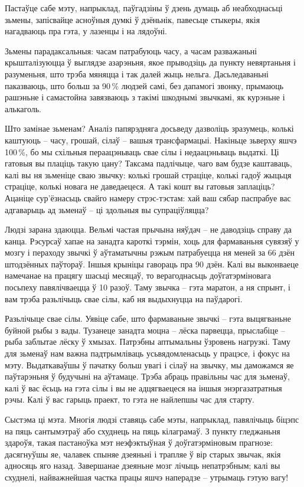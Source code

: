 Пастаўце сабе мэту, напрыклад, паўгадзіны ў дзень думаць аб неабходнасьці зьмены, запісвайце асноўныя думкі ў дзёньнік, павесьце стыкеры, якія нагадваюць пра гэта, у лазенцы і на лядоўні.

Зьмены парадаксальныя: часам патрабуюць часу, а часам разважаньні крышталізуюцца ў выглядзе азарэньня, якое прыводзіць да пункту невяртаньня і разуменьня, што трэба мяняцца і так далей жыць нельга. Дасьледаваньні паказваюць, што больш за 90\,\% людзей самі, без дапамогі звонку, прымаюць рашэньне і самастойна завязваюць з такімі шкоднымі звычкамі, як курэньне і алькаголь. 

Што замінае зьменам? Аналіз папярэдняга досьведу дазволіць зразумець, колькі каштуюць – часу, грошай, сілаў – вашыя трансфармацыі. Накіньце зьверху яшчэ 100\,\%, бо мы схільныя пераацэньваць свае сілы і недаацэньваць выдаткі. Ці гатовыя вы плаціць такую цану? Таксама падлічыце, чаго вам будзе каштаваць, калі вы ня зьменіце сваю звычку: колькі грошай страціце, колькі гадоў жыцьця страціце, колькі новага не даведаецеся. А такі кошт вы гатовыя заплаціць? Ацаніце сур'ёзнасьць свайго намеру стрэс-тэстам: хай ваш сябар паспрабуе вас адгаварыць ад зьменаў – ці здольныя вы супраціўляцца? 

Людзі зарана здаюцца. Вельмі частая прычына няўдач – не даводзіць справу да канца. Рэсурсаў хапае на занадта кароткі тэрмін, хоць для фармаваньня сувязяў у мозгу і пераходу звычкі ў аўтаматычны рэжым патрабуецца ня меней за 66 дзён штодзённых паўтораў. Іншыя крыніцы гавораць пра 90 дзён. Калі вы выконваеце намечанае на працягу шасьці месяцаў, то верагоднасьць доўгатэрміновага посьпеху павялічваецца ў 10 разоў. Таму звычка – гэта маратон, а ня спрынт, і вам трэба разьлічыць свае сілы, каб ня выдыхнуцца на паўдарогі.

Разьлічыце свае сілы. Уявіце сабе, што фармаваньне звычкі – гэта выцягваньне буйной рыбы з вады. Тузанеце занадта моцна – лёска парвецца, прыслабіце – рыба заблытае лёску ў хмызах. Патрэбны аптымальны ўзровень нагрузкі. Таму для зьменаў нам важна падтрымліваць усьвядомленасьць у працэсе, і фокус на мэту. Выдаткаваўшы ў пачатку больш увагі і сілаў на звычку, мы даможамся яе паўтарэньня ў будучыні на аўтамаце. Трэба абраць правільны час для зьменаў, калі ў вас ёсьць на гэта сілы і вы не адцягваецеся на іншыя энэргазатратныя рэчы. Калі ў вас гарыць праект, то гэта не найлепшы час для старту.

Сыстэма ці мэта. Многія людзі ставяць сабе мэты, напрыклад, павялічыць біцэпс на пяць сантымэтраў або схуднець на пяць кілаграмаў. З пункту гледжаньня здароўя, такая пастаноўка мэт неэфэктыўная ў доўгатэрміновым прагнозе: дасягнуўшы яе, чалавек спыняе дзеяньні і трапляе ў вір старых звычак, якія адносяць яго назад. Завершанае дзеяньне мозг лічыць непатрэбным; калі вы схуднелі, найважнейшая частка працы яшчэ наперадзе – утрымаць гэтую вагу! 

